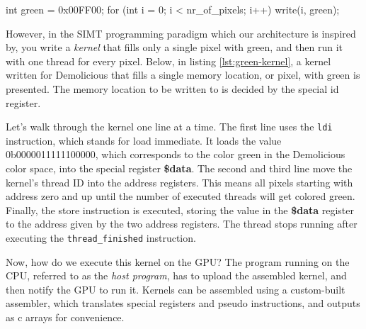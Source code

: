 \documentclass[../main/report.tex]{subfiles}
\begin{document}
\begin{c-code}[caption=A sequential program filling the screen with green, label=sequential-green]
int green = 0x00FF00;
for (int i = 0; i < nr_of_pixels; i++){
    write(i, green);
}
\end{c-code}

However, in the SIMT programming paradigm which our architecture is inspired by,
you write a \emph{kernel} that fills only a single pixel with green, 
and then run it with one thread for every pixel.
Below, in listing \ref{lst:green-kernel}, 
a kernel written for Demolicious that fills a single memory location,
or pixel, with green is presented.
The memory location to be written to is decided by the special id register.



Let's walk through the kernel one line at a time.
The first line uses the \verb/ldi/ instruction, which stands for load immediate.
It loads the value 0b0000011111100000,
which corresponds to the color green in the Demolicious color space,
into the special register \textbf{\$data}.
The second and third line move the kernel's thread ID into the address registers.
This means all pixels starting with address zero and up until the number of executed threads
will get colored green.
Finally, the store instruction is executed, storing the value in the \textbf{\$data} register
to the address given by the two address registers.
The thread stops running after executing the \verb/thread_finished/ instruction.

Now, how do we execute this kernel on the GPU?
The program running on the CPU, referred to as the \emph{host program},
has to upload the assembled kernel, and then notify the GPU to run it.
Kernels can be assembled using a custom-built assembler,
which translates special registers and pseudo instructions, and outputs as c arrays for convenience.

\end{document}
